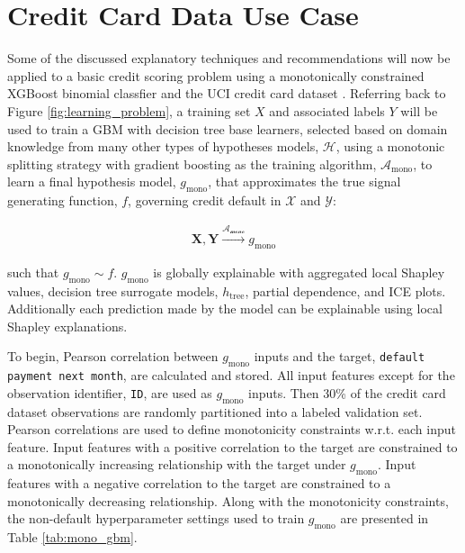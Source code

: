 \documentclass[11pt]{asaproc}
\begin{document}
\section{Credit Card Data Use Case} \label{sec:use_case}

Some of the discussed explanatory techniques and recommendations will now be applied to a basic credit scoring problem using a monotonically constrained XGBoost binomial classfier and the UCI credit card dataset \cite{uci}. Referring back to Figure \ref{fig:learning_problem}, a training set $X$ and associated labels $Y$ will be used to train a GBM with decision tree base learners, selected based on domain knowledge from many other types of hypotheses models, $\mathcal{H}$, using a monotonic splitting strategy with gradient boosting as the training algorithm, $\mathcal{A}_{\text{mono}}$, to learn a final hypothesis model, $g_{\text{mono}}$, that approximates the true signal generating function, $f$, governing credit default in $\mathcal{X}$ and $\mathcal{Y}$:

\begin{equation}
\label{eq:cc_training}
\begin{aligned}
\mathbf{X}, \mathbf{Y} \xrightarrow{\mathcal{A_{\text{mono}}}} g_{\text{mono}}
\end{aligned}
\end{equation}

\noindent such that $g_{\text{mono}} \sim f$. $g_{\text{mono}}$ is globally explainable with aggregated local Shapley values, decision tree surrogate models, $h_{\text{tree}}$, partial dependence, and ICE plots. Additionally each prediction made by the model can be explainable using local Shapley explanations. 

To begin, Pearson correlation between $g_{\text{mono}}$ inputs and the target, \texttt{default payment next month}, are calculated and stored. All input features except for the observation identifier, \texttt{ID}, are used as $g_{\text{mono}}$ inputs. Then 30\% of the credit card dataset observations are randomly partitioned into a labeled validation set. Pearson correlations are used to define monotonicity constraints w.r.t. each input feature. Input features with a positive correlation to the target are constrained to a monotonically increasing relationship with the target under $g_{\text{mono}}$. Input features with a negative correlation to the target are constrained to a monotonically decreasing relationship. Along with the monotonicity constraints, the non-default hyperparameter settings used to train $g_{\text{mono}}$ are presented in Table \ref{tab:mono_gbm}. 
\end{document}
